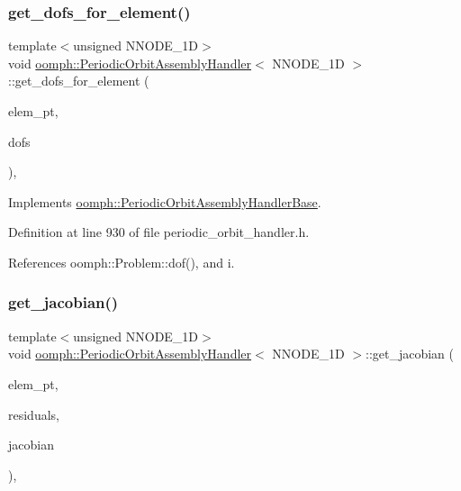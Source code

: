 \subsubsection{\texorpdfstring{get\+\_\+dofs\+\_\+for\+\_\+element()}{get\_dofs\_for\_element()}}
{\footnotesize\ttfamily template$<$unsigned N\+N\+O\+D\+E\+\_\+1D$>$ \\
void \hyperlink{classoomph_1_1PeriodicOrbitAssemblyHandler}{oomph\+::\+Periodic\+Orbit\+Assembly\+Handler}$<$ N\+N\+O\+D\+E\+\_\+1D $>$\+::get\+\_\+dofs\+\_\+for\+\_\+element (\begin{DoxyParamCaption}\item[{\hyperlink{classoomph_1_1GeneralisedElement}{Generalised\+Element} $\ast$const}]{elem\+\_\+pt,  }\item[{\hyperlink{classoomph_1_1Vector}{Vector}$<$ double $>$ \&}]{dofs }\end{DoxyParamCaption})\hspace{0.3cm}{\ttfamily [inline]}, {\ttfamily [virtual]}}



Implements \hyperlink{classoomph_1_1PeriodicOrbitAssemblyHandlerBase_a48968325ba57e969f64298c5b2dfb8f8}{oomph\+::\+Periodic\+Orbit\+Assembly\+Handler\+Base}.



Definition at line 930 of file periodic\+\_\+orbit\+\_\+handler.\+h.



References oomph\+::\+Problem\+::dof(), and i.

\mbox{\label{classoomph_1_1PeriodicOrbitAssemblyHandler_a6d901ecdefca1c59403a4ae4b215446f}} 
\subsubsection{\texorpdfstring{get\+\_\+jacobian()}{get\_jacobian()}}
{\footnotesize\ttfamily template$<$unsigned N\+N\+O\+D\+E\+\_\+1D$>$ \\
void \hyperlink{classoomph_1_1PeriodicOrbitAssemblyHandler}{oomph\+::\+Periodic\+Orbit\+Assembly\+Handler}$<$ N\+N\+O\+D\+E\+\_\+1D $>$\+::get\+\_\+jacobian (\begin{DoxyParamCaption}\item[{\hyperlink{classoomph_1_1GeneralisedElement}{Generalised\+Element} $\ast$const \&}]{elem\+\_\+pt,  }\item[{\hyperlink{classoomph_1_1Vector}{Vector}$<$ double $>$ \&}]{residuals,  }\item[{\hyperlink{classoomph_1_1DenseMatrix}{Dense\+Matrix}$<$ double $>$ \&}]{jacobian }\end{DoxyParamCaption})\hspace{0.3cm}{\ttfamily [inline]}, {\ttfamily [virtual]}}



